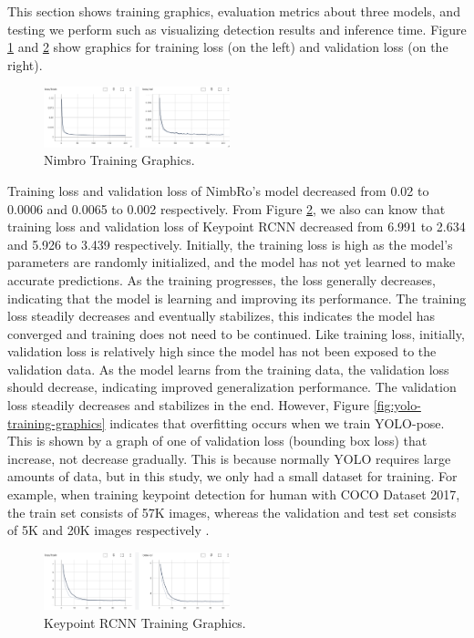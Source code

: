 This section shows training graphics, evaluation metrics about three models, and testing we perform such as visualizing detection results and inference time.
Figure \ref{fig:nimbro-training-graphics} and \ref{fig:rcnn-training-graphics} show graphics for training loss (on the left) and validation loss (on the right).
\begin{figure}[ht]
  \centering
  \includegraphics[width=0.48\textwidth]{gambar/loss-nimbro.png}
  \caption{Nimbro Training Graphics.}
  \label{fig:nimbro-training-graphics}
\end{figure}
Training loss and validation loss of NimbRo's model decreased from 0.02 to 0.0006 and 0.0065 to 0.002 respectively. From Figure \ref{fig:rcnn-training-graphics},
we also can know that training loss and validation loss of Keypoint RCNN decreased from 6.991 to 2.634 and 5.926 to 3.439 respectively. Initially, the training loss is high as the model's parameters are randomly initialized,
  and the model has not yet learned to make accurate predictions. As the training progresses, the loss generally decreases, indicating that the model is learning and improving its performance.
The training loss steadily decreases and eventually stabilizes, this indicates the model has converged and training does not need to be continued.
Like training loss, initially, validation loss is relatively high since the model has not been exposed to the validation data. As the model learns from the training data, the validation loss should decrease,
  indicating improved generalization performance. The validation loss steadily decreases and stabilizes in the end.
However, Figure \ref{fig:yolo-training-graphics} indicates that overfitting occurs when we train YOLO-pose. This is shown by a graph of one of validation loss (bounding box loss) that increase, not decrease gradually.
This is because normally YOLO requires large amounts of data, but in this study, we only had a small dataset for training. For example, when training keypoint detection for human with COCO Dataset 2017,
  the train set consists of 57K images, whereas the validation and test set consists of 5K and 20K images respectively \citep{maji2022yolopose}.
\begin{figure}[ht]
  \centering
  \includegraphics[width=0.48\textwidth]{gambar/loss-rcnn.png}
  \caption{Keypoint RCNN Training Graphics.}
  \label{fig:rcnn-training-graphics}
\end{figure}
